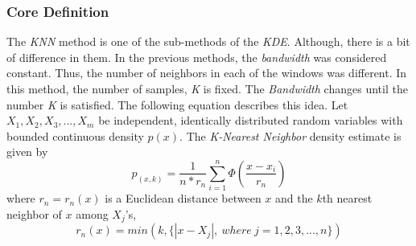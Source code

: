 \documentclass[12pt]{article}
\numberwithin{equation}{section}
\numberwithin{table}{section}
\numberwithin{figure}{section}
\begin{document}
\subsubsection*{Core Definition}
The \textit{KNN} method is one of the sub-methods of the \textit{KDE}. Although, there is a bit of difference in them. In the previous methods, the \textit{bandwidth} was considered constant. Thus, the number of neighbors in each of the windows was different. In this method, the number of samples, \textit{K} is fixed. The \textit{Bandwidth} changes until the number \textit{K} is satisfied. The following equation describes this idea. Let $X_1, X_2, X_3, ..., X_m$ be independent, identically distributed random variables with bounded continuous density $p(x)$. The \textit{K-Nearest Neighbor} density estimate is given by 
\begin{equation}
\hat{p}_{(x, k)} = \frac{1}{n*r_n} \sum_{i = 1}^{n}\Phi(\frac{x - x_i}{r_n})
\end{equation}
where $r_n = r_n(x)$ is a Euclidean distance between $x$ and the $k$th nearest neighbor of $x$ among $X_j$'s,
\begin{equation}
	r_n(x) = min(k, \{|x - X_j|,\ where\ j = 1, 2, 3, ..., n\})
\end{equation}
\end{document}
